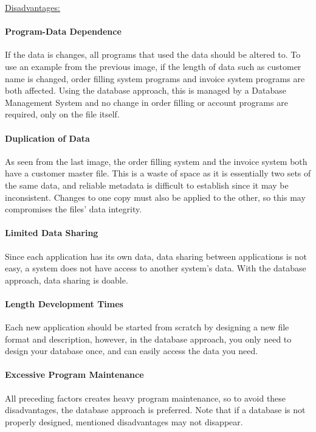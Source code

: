 \documentclass[12pt]{article}
\begin{document}
\underline{Disadvantages:}
\paragraph{Program-Data Dependence} If the data is changes, all programs that used the data should be altered to. To use an example from the previous image, if the length of data such as customer name is changed, order filling system programs and invoice system programs are both affected. Using the database approach, this is managed by a Database Management System and no change in order filling or account programs are required, only on the file itself.

\paragraph{Duplication of Data} As seen from the last image, the order filling system and the invoice system both have a customer master file. This is a waste of space as it is essentially two sets of the same data, and reliable metadata is difficult to establish since it may be inconsistent. Changes to one copy must also be applied to the other, so this may compromises the files' data integrity.

\paragraph{Limited Data Sharing} Since each application has its own data, data sharing between applications is not easy, a system does not have access to another system's data. With the database approach, data sharing is doable.

\paragraph{Length Development Times} Each new application should be started from scratch by designing a new file format and description, however, in the database approach, you only need to design your database once, and can easily access the data you need.

\paragraph{Excessive Program Maintenance} All preceding factors creates heavy program maintenance, so to avoid these disadvantages, the database approach is preferred. Note that if a database is not properly designed, mentioned disadvantages may not disappear.
\end{document}
